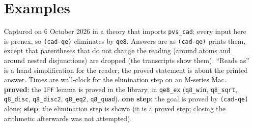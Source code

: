 \documentclass[11pt]{article}
\newcommand\proved{\textcolor{moss}{\textbf{proved}}}
\newcommand\onestep{\textcolor{moss}{\textbf{one step}}}
\newcommand\stepok{\textcolor{accent}{\textbf{step}}}
\begin{document}
\section{Examples}
Captured on 6 October 2026 in a theory that imports \texttt{pvs\_cad}; every input here is prenex, so
\texttt{(cad-qe)} eliminates by \texttt{qe8}. Answers are as \texttt{(cad-qe)} prints them, except that parentheses that do
not change the reading (around atoms and around nested disjunctions) are dropped (the transcripts show them). ``Reads as'' is a hand
simplification for the reader; the proved statement is about the printed answer. Times are wall-clock for the
elimination step on an M-series Mac. \proved: the \texttt{IFF} lemma is proved in the library, in
\texttt{qe8\_ex} (\texttt{q8\_win}, \texttt{q8\_sqrt}, \texttt{q8\_disc}, \texttt{q8\_disc2}, \texttt{q8\_eq2},
\texttt{q8\_quad}). \onestep: the goal is proved by \texttt{(cad-qe)} alone; \stepok: the elimination step is shown (it is
a proved step; closing the arithmetic afterwards was not attempted).
\end{document}

